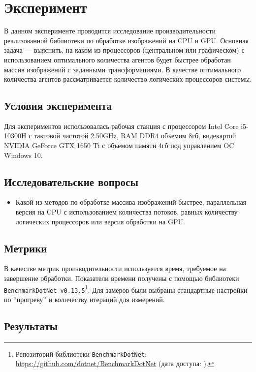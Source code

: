 
\section{Эксперимент}
В данном эксперименте проводится исследование производительности реализованной библиотеки по обработке изображений на CPU и GPU. Основная задача --- выяснить, на каком из процессоров (центральном или графическом) с использованием оптимального количества агентов будет быстрее обработан массив изображений с заданными трансформациями. В качестве оптимального количества агентов рассматривается количество логических процессоров системы.

\subsection{Условия эксперимента}
Для экспериментов использовалась рабочая станция с процессором Intel Core i5-10300H с тактовой частотой 2.50GHz, RAM DDR4 объемом 8гб, видекартой NVIDIA GeForce GTX 1650 Ti с объемом памяти 4гб под управлением OC Windows 10.

\subsection{Исследовательские вопросы }

\begin{itemize}
\item Какой из методов по обработке массива изображений быстрее, параллельная версия на CPU с использованием количества потоков, равных количеству логических процессоров или версия обработки на GPU.
\end{itemize}

\subsection{Метрики}
В качестве метрик производительности используется время, требуемое на завершение обработки. Показатели времени получены с помощью библиотеки \texttt{BenchmarkDotNet v0.13.5}\footnote{Репозиторий библиотеки \texttt{BenchmarkDotNet}: \url{https://github.com/dotnet/BenchmarkDotNet} (дата доступа:   ).}. Для замеров были выбраны стандартные настройки по \enquote{прогреву} и количеству итераций для измерений.

\subsection{Результаты}


